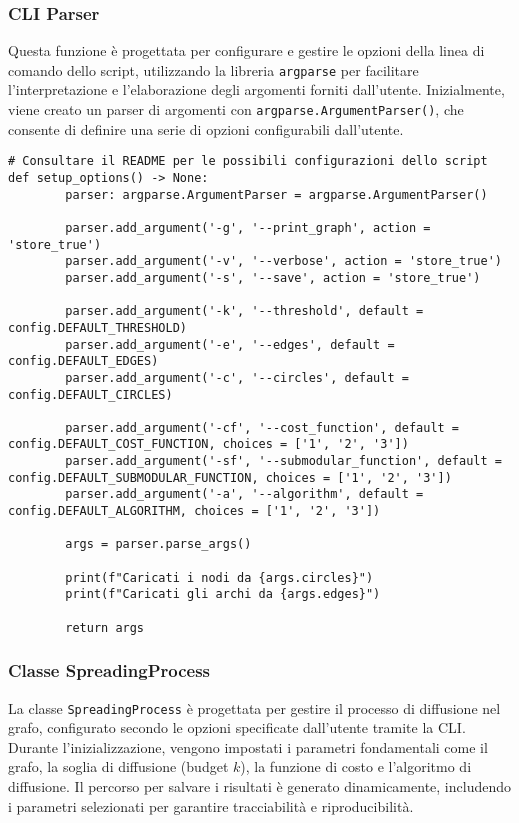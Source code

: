 \subsubsection{CLI Parser}

Questa funzione è progettata per configurare e gestire le opzioni della linea di comando dello script, utilizzando la libreria \texttt{argparse} per facilitare l'interpretazione e l'elaborazione degli argomenti forniti dall'utente. Inizialmente, viene creato un parser di argomenti con \texttt{argparse.ArgumentParser()}, che consente di definire una serie di opzioni configurabili dall'utente.

\begin{code}
\begin{verbatim}
# Consultare il README per le possibili configurazioni dello script
def setup_options() -> None:
        parser: argparse.ArgumentParser = argparse.ArgumentParser()

        parser.add_argument('-g', '--print_graph', action = 'store_true')
        parser.add_argument('-v', '--verbose', action = 'store_true')
        parser.add_argument('-s', '--save', action = 'store_true')

        parser.add_argument('-k', '--threshold', default = config.DEFAULT_THRESHOLD)
        parser.add_argument('-e', '--edges', default = config.DEFAULT_EDGES)
        parser.add_argument('-c', '--circles', default = config.DEFAULT_CIRCLES)

        parser.add_argument('-cf', '--cost_function', default = config.DEFAULT_COST_FUNCTION, choices = ['1', '2', '3'])
        parser.add_argument('-sf', '--submodular_function', default = config.DEFAULT_SUBMODULAR_FUNCTION, choices = ['1', '2', '3'])
        parser.add_argument('-a', '--algorithm', default = config.DEFAULT_ALGORITHM, choices = ['1', '2', '3'])

        args = parser.parse_args()

        print(f"Caricati i nodi da {args.circles}")
        print(f"Caricati gli archi da {args.edges}")

        return args
\end{verbatim}
\end{code}

\subsubsection{Classe SpreadingProcess}

La classe \texttt{SpreadingProcess} è progettata per gestire il processo di diffusione nel grafo, configurato secondo le opzioni specificate dall'utente tramite la CLI. Durante l'inizializzazione, vengono impostati i parametri fondamentali come il grafo, la soglia di diffusione (budget $ k $), la funzione di costo e l'algoritmo di diffusione. Il percorso per salvare i risultati è generato dinamicamente, includendo i parametri selezionati per garantire tracciabilità e riproducibilità.

